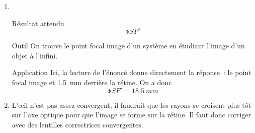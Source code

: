 \documentclass[a4paper, 12pt, final, garamond]{book}
\begin{document}
\begin{enumerate}
    \item ~
        \begin{tcbraster}[raster columns=5, raster equal height=rows]
            \begin{NCprop}{Résultat attendu}
                \[\obar{SF'}\]
            \end{NCprop}
            \begin{NCrapp}[raster multicolumn=2]{Outil}
                On trouve le point focal image d'un système en étudiant l'image d'un
                objet à l'infini.
            \end{NCrapp}
            \begin{NCexem}[raster multicolumn=2]{Application}
                Ici, la lecture de l'énoncé donne directement la réponse~: le point
                focal image et \SI{1.5}{mm} derrière la rétine. On a donc \[\obar{SF'} =
                \SI{18.5}{mm}\]
            \end{NCexem}
        \end{tcbraster}
    \item L'œil n'est pas assez convergent, il faudrait que les rayons se
        croisent plus tôt sur l'axe optique pour que l'image se forme sur la
        rétine. Il faut donc corriger avec des lentilles correctrices
        convergentes.


\end{enumerate}
\end{document}
